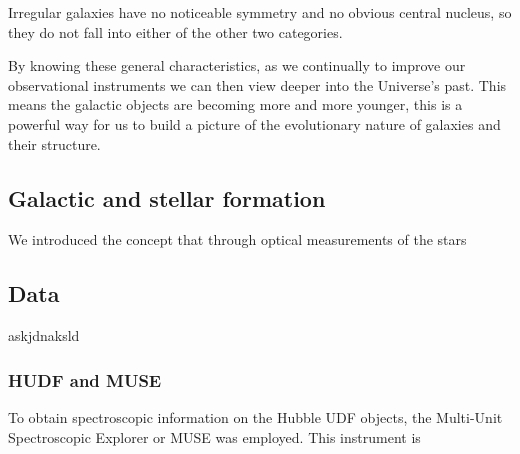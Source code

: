 \documentclass[12pt, twocolumn]{revtex4}    %
\begin{document}
Irregular galaxies have no noticeable symmetry and no obvious central nucleus, so they do not fall into either of the other two categories.


By knowing these general characteristics, as we continually to improve our observational instruments we can then view deeper into the Universe's past. This means the galactic objects are becoming more and more younger, this is a powerful way for us to build a picture of the evolutionary nature of galaxies and their structure. 

\subsection{Galactic and stellar formation}


We introduced the concept that through optical measurements of the stars 


\subsection{Data} 

askjdnaksld

\subsubsection{HUDF and MUSE}

To obtain spectroscopic information on the Hubble UDF objects, the Multi-Unit Spectroscopic Explorer or MUSE was employed. This instrument is 


\onecolumngrid
\end{document}
